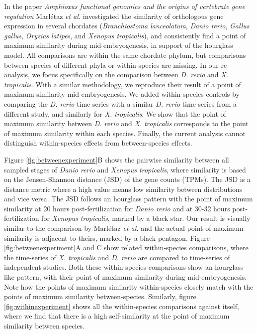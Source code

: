 In the paper \textit{Amphioxus functional genomics and the origins of vertebrate gene regulation}\cite{marletaz2018} Marl\'etaz \textit{et al.} investigated the similarity of orthologous gene expression in several chordates (\textit{Branchiostoma lanceolatum}, \textit{Danio rerio}, \textit{Gallus gallus}, \textit{Oryzias latipes}, and \textit{Xenopus tropicalis}), and consistently find a point of maximum similarity during mid-embryogenesis, in support of the hourglass model. All comparisons are within the same chordate phylum, but comparisons between species of different phyla or within-species are missing. In our re-analysis, we focus specifically on the comparison between \textit{D. rerio} and \textit{X. tropicalis}. With a similar methodology, we reproduce their result of a point of maximum similarity mid-embryogenesis. We added within-species controls by comparing the \textit{D. rerio} time series with a similar \textit{D. rerio} time series from a different study, and similarly for \textit{X. tropicalis}. We show that the point of maximum similarity between \textit{D. rerio} and \textit{X. tropicalis} corresponds to the point of maximum similarity within each species. Finally, the current analysis cannot distinguish within-species effects from between-species effects.

Figure \ref{fig:betweenexperiment}B shows the pairwise similarity between all sampled stages of \textit{Danio rerio} and \textit{Xenopus tropicalis}, where similarity is based on the Jensen-Shannon distance (JSD) of the gene counts (TPMs). The JSD is a distance metric where a high value means low similarity between distributions and vice versa. The JSD follows an hourglass pattern with the point of maximum similarity at 20 hours post-fertilization for \textit{Danio rerio} and at 30-32 hours post-fertilization for \textit{Xenopus tropicalis}, marked by a black star. Our result is visually similar to the comparison by Marl\'etaz \textit{et al.} and the actual point of maximum similarity is adjacent to theirs, marked by a black pentagon. Figure \ref{fig:betweenexperiment}A and C show related within-species comparisons, where the time-series of \textit{X. tropicalis} and \textit{D. rerio} are compared to time-series of independent studies\cite{Hu2017,White2017}. Both these within-species comparisons show an hourglass-like pattern, with their point of maximum similarity during mid-embryogenesis. Note how the points of maximum similarity within-species closely match with the points of maximum similarity between-species. Similarly, figure \ref{fig:withinexperiment} shows all the within-species comparisons against itself, where we find that there is a high self-similarity at the point of maximum similarity between species. 


